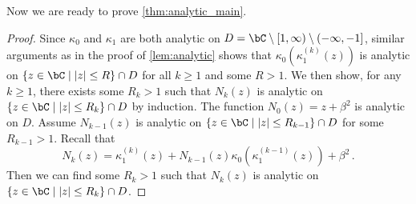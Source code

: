 \documentclass[11pt]{article}
\newcommand{\g}{\kappa_1}
\begin{document}
Now we are ready to prove \cref{thm:analytic_main}.
\begin{proof}
Since $\kappa_0$ and $\g$ are both analytic on $D = \bC\setminus [1,\infty) \setminus (-\infty,-1] $, similar arguments as in the proof of \cref{lem:analytic} shows that $\kappa_0(\g^{(k)}(z))$ is analytic on $\{z\in \bC\mid  |z|\le R\}\cap D$ for all $k\ge 1$ and some $R>1$. We then show, for any $k\geq 1$, there exists some $R_k>1$ such that $N_k(z)$ is analytic on $\{z\in \bC  \mid |z|\le R_k\}\cap D$ by induction. The function $N_0(z) = z+\beta^2$ is analytic on $D$. Assume $N_{k-1}(z)$ is analytic on $\{z\in \bC \mid |z|\le R_{k-1}\} \cap D$ for some $R_{k-1}>1$. Recall that \[
N_k(z) ={} \g^{(k)}(z) + N_{k-1}(z)\kappa_0(\g^{(k-1)}(z)) + \beta^2\,.
\]
Then we can find some $R_k>1$ such that $N_k(z)$ is analytic on $\{z \in \bC \mid |z|\le R_k\}\cap D$. 
\end{proof}
\end{document}
